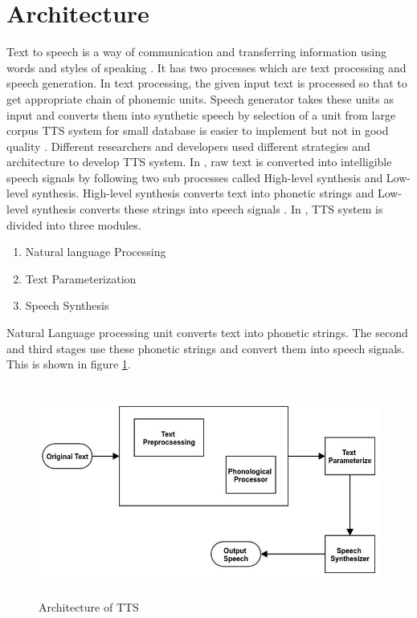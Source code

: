 \section{Architecture}
Text to speech is a way of communication and transferring information using words and styles of
speaking \cite{eide2004corpus}. It has two processes which are text processing and speech
generation. In text processing, the given input text is processed so that to get appropriate chain of
phonemic units. Speech generator takes these units as input and converts them into synthetic
speech by selection of a unit from large corpus TTS system for small database is easier to
implement but not in good quality \cite{black2007statistical, zen2007hmm, raj2007text}.
Different researchers and developers used different strategies and architecture to develop TTS system. In \cite{kabir2002natural}, raw text is converted into intelligible speech signals by following two sub processes called High-level synthesis and Low-level synthesis. High-level
synthesis converts text into phonetic strings and Low-level synthesis converts these strings into
speech signals \cite{kabir2002natural}. In \cite{hussain2005phonological}, TTS system is divided into three modules.

\begin{enumerate}
  \item Natural language Processing
  \item Text Parameterization
  \item Speech Synthesis
\end{enumerate}

Natural Language processing unit converts text into phonetic strings. The second and
third stages use these phonetic strings and convert them into speech signals. This is shown in figure \ref{fig:Architecture of TTS}.

\begin{figure}
  \centering
  \includegraphics[width=\linewidth, height=7cm,keepaspectratio]{images/tts_block_dg.jpg}
  \caption{Architecture of TTS}
  \label{fig:Architecture of TTS}
\end{figure}

